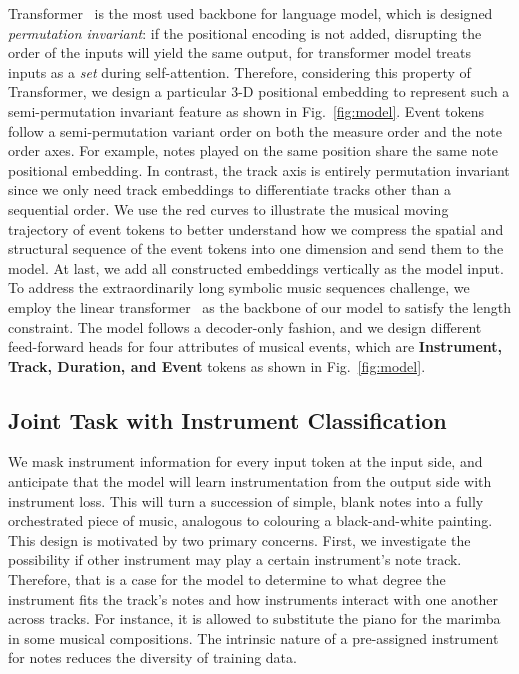\documentclass{article}
\begin{document}
Transformer~\cite{vaswani2017attention} is the most used backbone for language model, which is designed \emph{permutation invariant}: if the positional encoding is not added, disrupting the order of the inputs will yield the same output, for transformer model treats inputs as a \emph{set} during self-attention. Therefore, considering this property of Transformer, we design a particular 3-D positional embedding to represent such a semi-permutation invariant feature as shown in Fig.~\ref{fig:model}. Event tokens follow a semi-permutation variant order on both the measure order and the note order axes. For example, notes played on the same position share the same note positional embedding. In contrast, the track axis is entirely permutation invariant since we only need track embeddings to differentiate tracks other than a sequential order. We use the red curves to illustrate the musical moving trajectory of event tokens to better understand how we compress the spatial and structural sequence of the event tokens into one dimension and send them to the model. At last, we add all constructed embeddings vertically as the model input. To address the extraordinarily long symbolic music sequences challenge, we employ the linear transformer~\cite{lineartrans} as the backbone of our model to satisfy the length constraint. The model follows a decoder-only fashion, and we design different feed-forward heads for four attributes of musical events, which are \textbf{Instrument, Track, Duration, and Event} tokens as shown in Fig.~\ref{fig:model}.

\subsection{Joint Task with Instrument Classification}

We mask instrument information for every input token at the input side, and anticipate that the model will learn instrumentation from the output side with instrument loss. This will turn a succession of simple, blank notes into a fully orchestrated piece of music, analogous to colouring a black-and-white painting. This design is motivated by two primary concerns. First, we investigate the possibility if other instrument may play a certain instrument's note track. Therefore, that is a case for the model to determine to what degree the instrument fits the track's notes and how instruments interact with one another across tracks. For instance, it is allowed to substitute the piano for the marimba in some musical compositions. The intrinsic nature of a pre-assigned instrument for notes reduces the diversity of training data. 
\end{document}
